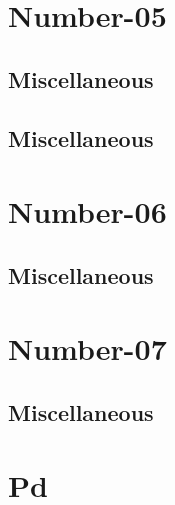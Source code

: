 \section{Number-05}
\subsection{Miscellaneous}
\raggedbottom
\vspace{-.7\baselineskip}\hrulefill
\vspace{0.1\baselineskip}\subsection{Miscellaneous}
\raggedbottom
\vspace{-.7\baselineskip}\hrulefill
\vspace{0.1\baselineskip}
\section{Number-06}
\subsection{Miscellaneous}
\raggedbottom
\vspace{-.7\baselineskip}\hrulefill
\vspace{0.1\baselineskip}
\section{Number-07}
\subsection{Miscellaneous}
\raggedbottom
\vspace{-.7\baselineskip}\hrulefill
\vspace{0.1\baselineskip}
\section{Pd}
